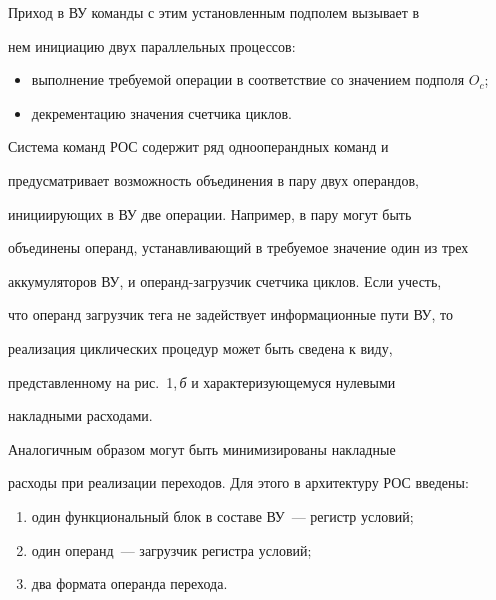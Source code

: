       Приход в ВУ команды с этим установленным подполем вызывает в 


нем инициацию двух параллельных процессов:


      \begin{itemize}


\item выполнение требуемой операции в соответствие со значением подполя $O_c$;


\item  декрементацию значения счетчика циклов.


\end{itemize}





      Система команд РОС содержит ряд однооперандных команд и 


предусматривает возможность объединения в пару двух операндов, 


инициирующих в ВУ две операции. Например, в пару могут быть 


объединены операнд, устанавливающий в требуемое значение один из трех 


аккумуляторов ВУ, и опе\-ранд-за\-груз\-чик счетчика циклов. Если учесть, 


что операнд загрузчик тега не задействует информационные пути ВУ, то 


реализация циклических процедур может быть сведена к виду, 


представленному на рис.~1,\,\textit{б} и характеризующемуся нулевыми 


накладными расходами. 


      


      Аналогичным образом могут быть минимизированы накладные 


расходы при реализации переходов. Для этого в архитектуру РОС введены:


      \begin{enumerate}[(1)]


      \item один функциональный блок в составе ВУ~--- регистр условий;


      \item один операнд~--- загрузчик регистра условий;


      \item два формата операнда перехода.


      \end{enumerate}


